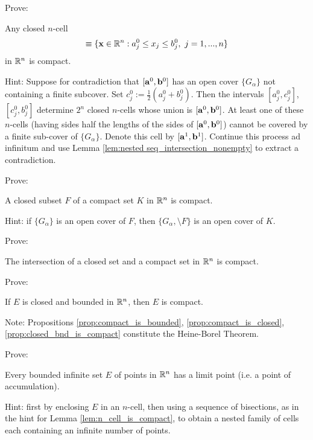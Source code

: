 \noindent
Prove:
\begin{lem}\label{lem:n_cell_is_compact}
Any closed $n$-cell
\begin{equation*}
  [\va^0, \vb^0] \equiv \{ \vx \in \R^n : a_j^0 \leq x_j \leq b_j^0, ~ j = 1, ..., n \}
\end{equation*}
in $\mathbb{R}^n$ is compact.
\end{lem}
\noindent
Hint: Suppose for contradiction that $[\mathbf{a}^0, \mathbf{b}^0]$ has an open cover $\{ G_\alpha \}$ not containing a finite subcover.  Set $c_j^0 := \frac{1}{2} (a_j^0 + b_j^0)$.  Then the intervals $[a_j^0, c_j^0]$, $[c_j^0, b_j^0]$ determine $2^n$ closed $n$-cells whose union is $[\mathbf{a}^0, \mathbf{b}^0]$.  At least one of these $n$-cells (having sides half the lengths of the sides of $[\mathbf{a}^0, \mathbf{b}^0]$) cannot be covered by a finite sub-cover of $\{ G_{\alpha} \}$.  Denote this cell by $[\mathbf{a}^1, \mathbf{b}^1]$.  Continue this process ad infinitum and use Lemma \ref{lem:nested seq_intersection_nonempty} to extract a contradiction.

\medskip

\noindent
Prove:
\begin{prop}
A closed subset $F$ of a compact set $K$ in $\mathbb{R}^n$ is compact.
\end{prop}
\noindent
Hint: if $\{ G_\alpha \}$ is an open cover of $F$, then $\{ G_\alpha, \setminus F \}$ is an open cover of $K$.

\medskip

\noindent
Prove:
\begin{cor}
The intersection of a closed set and a compact set in $\mathbb{R}^n$ is compact.
\end{cor}

\noindent
Prove:
\begin{prop}\label{prop:closed_bnd_is_compact}
If $E$ is closed and bounded in $\mathbb{R}^n$, then $E$ is compact.
\end{prop}

\medskip

\noindent
Note: Propositions \ref{prop:compact_is_bounded}, \ref{prop:compact_is_closed}, \ref{prop:closed_bnd_is_compact} constitute the Heine-Borel Theorem.

\bigskip

\noindent
Prove:
\begin{thm}\label{thm:bolzano-weierstrass}
Every bounded infinite set $E$ of points in $\mathbb{R}^n$ has a limit point (i.e. a point of accumulation).
\end{thm}
\noindent
Hint: first by enclosing $E$ in an $n$-cell, then using a sequence of bisections, as in the hint for Lemma \ref{lem:n_cell_is_compact}, to obtain a nested family of cells each containing an infinite number of points.

